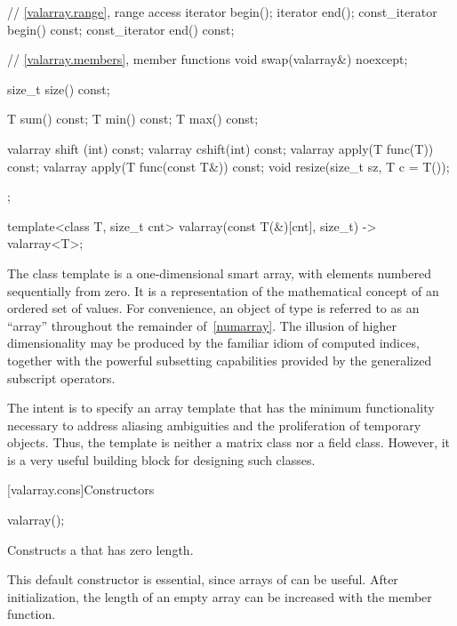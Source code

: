 \begin{codeblock}
{{    // \ref{valarray.range}, range access
    iterator begin();
    iterator end();
    const_iterator begin() const;
    const_iterator end() const;

    // \ref{valarray.members}, member functions
    void swap(valarray&) noexcept;

    size_t size() const;

    T sum() const;
    T min() const;
    T max() const;

    valarray shift (int) const;
    valarray cshift(int) const;
    valarray apply(T func(T)) const;
    valarray apply(T func(const T&)) const;
    void resize(size_t sz, T c = T());
  };

  template<class T, size_t cnt> valarray(const T(&)[cnt], size_t) -> valarray<T>;
}
\end{codeblock}

\pnum
The
class template
is a
one-dimensional smart array, with elements numbered sequentially from zero.
It is a representation of the mathematical concept
of an ordered set of values.
For convenience, an object of type  is referred
to as an ``array'' throughout the remainder of~\ref{numarray}.
The illusion of higher dimensionality
may be produced by the familiar idiom of computed indices, together
with the powerful subsetting capabilities provided
by the generalized subscript operators.
\begin{footnote}
The intent is to specify
an array template that has the minimum functionality
necessary to address aliasing ambiguities and the proliferation of
temporary objects.
Thus, the
template is neither a
matrix class nor a field class.
However, it is a very useful building block for designing such classes.
\end{footnote}

[valarray.cons]{Constructors}

%
\begin{itemdecl}
valarray();
\end{itemdecl}

\begin{itemdescr}
\pnum
\effects
Constructs a 
that has zero length.
\begin{footnote}
This default constructor is essential,
since arrays of
can be useful.
After initialization, the length of an empty array can be increased with the
member function.
\end{footnote}
\end{itemdescr}

